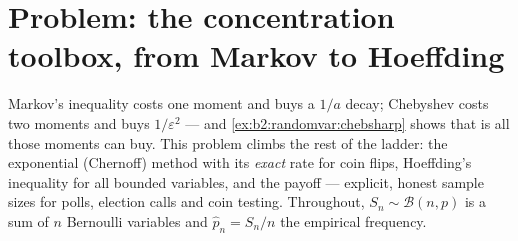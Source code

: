 \section{Problem: the concentration toolbox, from Markov to
Hoeffding}

\begin{problem}
\label{pb:b2:randomvar:1}
Markov's inequality costs one moment and buys a $1/a$ decay;
Chebyshev costs two moments and buys $1/\varepsilon^2$ ---
and \cref{ex:b2:randomvar:chebsharp} shows that is all those
moments can buy. This problem climbs the rest of the ladder:
the exponential (Chernoff) method with its \emph{exact} rate
for coin flips, Hoeffding's inequality for all bounded
variables, and the payoff --- explicit, honest sample sizes
for polls, election calls and coin testing.
 Throughout, $S_n \sim
\mathcal B(n, p)$ is a sum of $n$  Bernoulli
variables and $\widehat p_n = S_n/n$ the empirical frequency.


\end{problem}

